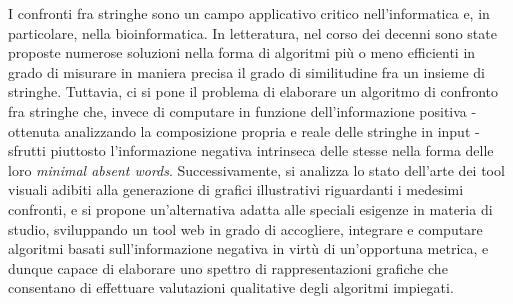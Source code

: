 I confronti fra stringhe sono un campo applicativo critico nell'informatica e, in particolare, nella bioinformatica. In letteratura, nel corso dei decenni sono state proposte numerose soluzioni nella forma di algoritmi più o meno efficienti in grado di misurare in maniera precisa il grado di similitudine fra un insieme di stringhe. Tuttavia, ci si pone il problema di elaborare un algoritmo di confronto fra stringhe che, invece di computare in funzione dell'informazione positiva - ottenuta analizzando la composizione propria e reale delle stringhe in input - sfrutti piuttosto l'informazione negativa intrinseca delle stesse nella forma delle loro \textit{minimal absent words}. Successivamente, si analizza lo stato dell'arte dei tool visuali adibiti alla generazione di grafici illustrativi riguardanti i medesimi confronti, e si propone un'alternativa adatta alle speciali esigenze in materia di studio, sviluppando un tool web in grado di accogliere, integrare e computare algoritmi basati sull'informazione negativa in virtù di un'opportuna metrica, e dunque capace di elaborare uno spettro di rappresentazioni grafiche che consentano di effettuare valutazioni qualitative degli algoritmi impiegati.